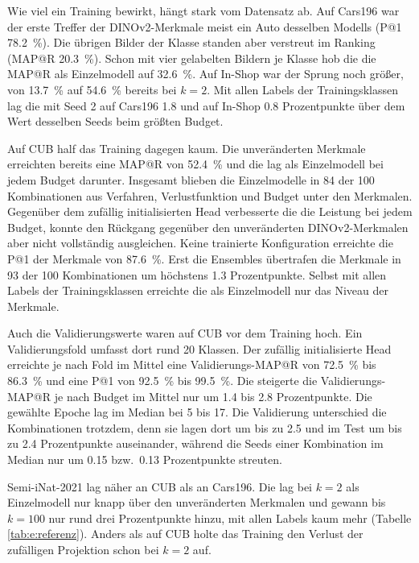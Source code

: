 

Wie viel ein Training bewirkt, hängt stark vom Datensatz ab. Auf Cars196 war der erste Treffer der DINOv2-Merkmale meist ein Auto desselben Modells (\ac{P@1} \qty{78.2}{\percent}). Die übrigen Bilder der Klasse standen aber verstreut im Ranking (\ac{MAP@R} \qty{20.3}{\percent}). Schon mit vier gelabelten Bildern je Klasse hob die \UEBL die \ac{MAP@R} als Einzelmodell auf \qty{32.6}{\percent}. Auf In-Shop war der Sprung noch größer, von \qty{13.7}{\percent} auf \qty{54.6}{\percent} bereits bei $k=2$. Mit allen Labels der Trainingsklassen lag die \UEBL mit Seed 2 auf Cars196 \num{1.8} und auf In-Shop \num{0.8} Prozentpunkte über dem Wert desselben Seeds beim größten Budget.

Auf \ac{CUB} half das Training dagegen kaum. Die unveränderten Merkmale erreichten bereits eine \ac{MAP@R} von \qty{52.4}{\percent} und die \UEBL lag als Einzelmodell bei jedem Budget darunter. Insgesamt blieben die Einzelmodelle in 84 der 100 Kombinationen aus Verfahren, Verlustfunktion und Budget unter den Merkmalen. Gegenüber dem zufällig initialisierten Head verbesserte die \UEBL die Leistung bei jedem Budget, konnte den Rückgang gegenüber den unveränderten DINOv2-Merkmalen aber nicht vollständig ausgleichen. Keine trainierte Konfiguration erreichte die \ac{P@1} der Merkmale von \qty{87.6}{\percent}. Erst die Ensembles übertrafen die Merkmale in 93 der 100 Kombinationen um höchstens \num{1.3} Prozentpunkte. Selbst mit allen Labels der Trainingsklassen erreichte die \UEBL als Einzelmodell nur das Niveau der Merkmale.

Auch die Validierungswerte waren auf \ac{CUB} vor dem Training hoch. Ein Validierungsfold umfasst dort rund 20 Klassen. Der zufällig initialisierte Head erreichte je nach Fold im Mittel eine Validierungs-\ac{MAP@R} von \qty{72.5}{\percent} bis \qty{86.3}{\percent} und eine \ac{P@1} von \qty{92.5}{\percent} bis \qty{99.5}{\percent}. Die \UEBL steigerte die Validierungs-\ac{MAP@R} je nach Budget im Mittel nur um \num{1.4} bis \num{2.8} Prozentpunkte. Die gewählte Epoche lag im Median bei 5 bis 17. Die Validierung unterschied die Kombinationen trotzdem, denn sie lagen dort um bis zu \num{2.5} und im Test um bis zu \num{2.4} Prozentpunkte auseinander, während die Seeds einer Kombination im Median nur um \num{0.15} bzw.\ \num{0.13} Prozentpunkte streuten.

Semi-iNat-2021 lag näher an \ac{CUB} als an Cars196. Die \UEBL lag bei $k=2$ als Einzelmodell nur knapp über den unveränderten Merkmalen und gewann bis $k=100$ nur rund drei Prozentpunkte hinzu, mit allen Labels kaum mehr (Tabelle \ref{tab:e:referenz}). Anders als auf \ac{CUB} holte das Training den Verlust der zufälligen Projektion schon bei $k=2$ auf.%


